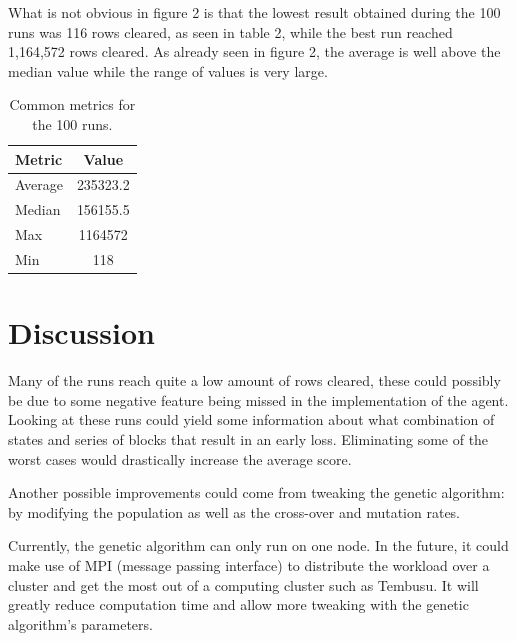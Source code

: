 \documentclass[twocolumn,12pt,journal,final]{IEEEtran_modified}
\begin{document}
What is not obvious in figure 2 is that the lowest result obtained during the 100 runs was 116 rows cleared, as seen in table 2, while the best run reached 1,164,572 rows cleared. As already seen in figure 2, the average is well above the median value while the range of values is very large.

\begin{table}[h]
\normalsize
  \begin{center}
    \begin{tabular}{| l | c |}
    \hline
    \textbf{Metric} & \textbf{Value} \\
    \hline
    Average & 235323.2 \\ \hline
    Median & 156155.5 \\ \hline
    Max & 1164572 \\ \hline
    Min & 118 \\ \hline
    \end{tabular}
  \end{center}
  \caption{Common metrics for the 100 runs.}
  \label{tab:results}
\end{table}

\section{Discussion}

Many of the runs reach quite a low amount of rows cleared, these could possibly be due to some negative feature being missed in the implementation of the agent. Looking at these runs could yield some information about what combination of states and series of blocks that result in an early loss. Eliminating some of the worst cases would drastically increase the average score.

Another possible improvements could come from tweaking the genetic algorithm: by modifying the population as well as the cross-over and mutation rates.

Currently, the genetic algorithm can only run on one node. In the future, it could make use of MPI (message passing interface) to distribute the workload over a cluster and get the most out of a computing cluster such as Tembusu. It will greatly reduce computation time and allow more tweaking with the genetic algorithm’s parameters.
\end{document}
